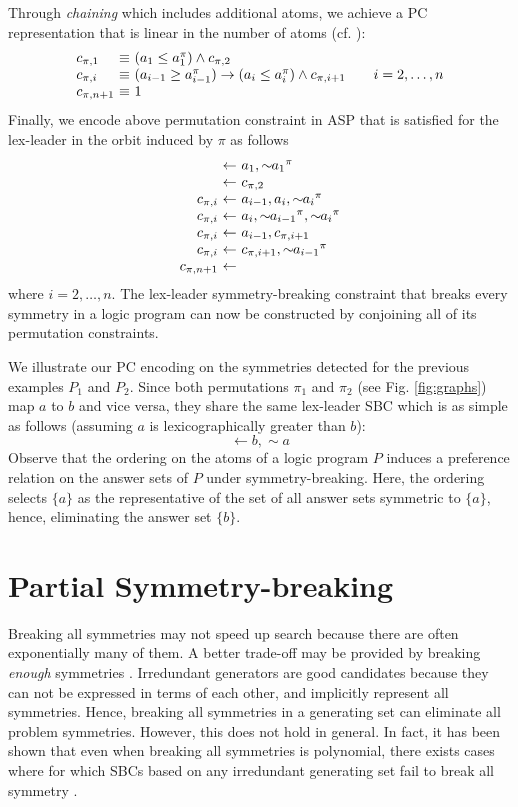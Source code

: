 \documentclass[envcountsame]{llncs}
\newcommand{\dneg}[0]{\sim\!\!}
\begin{document}
Through \emph{chaining} which includes additional atoms, we achieve a PC representation that is linear in the number of atoms (cf. \cite{almasa03a}):
\[
\begin{array}{l@{\ \equiv\ }l}
c_{\pi,1} & (a_1 \leq a_1^\pi) \land c_{\pi,2}\\
c_{\pi,i} & (a_{i-1} \geq a_{i-1}^\pi) \rightarrow (a_i \leq a_i^\pi) \land c_{\pi,i+1}\qquad i = 2,\dots,n\\
c_{\pi,n+1} & 1
\end{array}
\]
Finally, we encode above permutation constraint in ASP that is satisfied for the lex-leader in the orbit induced by $\pi$ as follows
\[
\begin{array}{r@{\ \leftarrow\ }l}
& a_1, \dneg {a_1}^\pi \\
& c_{\pi,2} \\
c_{\pi,i} & a_{i-1}, a_i, \dneg {a_i}^\pi \\
c_{\pi,i} & a_i, \dneg {a_{i-1}}^\pi, \dneg {a_i}^\pi \\
c_{\pi,i} & a_{i-1}, c_{\pi,i+1} \\
c_{\pi,i} & c_{\pi,i+1}, \dneg {a_{i-1}}^\pi \\
c_{\pi,n+1} &
\end{array}
\]
where $i=2,\dots,n$. The lex-leader symmetry-breaking constraint that breaks every symmetry in a logic program can now be constructed by conjoining all of its permutation constraints. 
\begin{example}
We illustrate our PC encoding on the symmetries detected for the previous examples $P_1$ and $P_2$. Since both permutations $\pi_1$ and $\pi_2$ (see Fig. \ref{fig:graphs}) map $a$ to $b$ and vice versa, they share the same lex-leader SBC which is as simple as follows (assuming $a$ is lexicographically greater than $b$):
\[
\leftarrow b, \dneg a
\]
Observe that the ordering on the atoms of a logic program $P$ induces a preference relation on the answer sets of $P$ under symmetry-breaking. Here, the ordering selects $\{a\}$ as the representative of the set of all answer sets symmetric to $\{a\}$, hence, eliminating the answer set $\{b\}$. 
\end{example}


\section{Partial Symmetry-breaking \label{sec:psb}}
Breaking all symmetries may not speed up search because there are often exponentially many of them. A better trade-off may be provided by breaking \emph{enough} symmetries \cite{crgiluro96a}. Irredundant generators are good candidates because they can not be expressed in terms of each other, and implicitly represent all symmetries.
Hence, breaking all symmetries in a generating set can eliminate all problem symmetries. However, this does not hold in general. In fact, it has been shown that even when breaking all symmetries is polynomial, there exists cases where for which SBCs based on any irredundant generating set fail to break all symmetry \cite{kanawa09a}.
\end{document}
